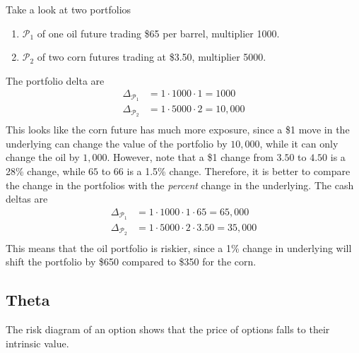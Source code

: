 \documentclass{article}
\begin{document}
    \begin{example}
      Take a look at two portfolios  
      \begin{enumerate}
        \item $\mathcal{P}_1$ of one oil future trading \$65 per barrel, multiplier 1000. 
        \item $\mathcal{P}_2$ of two corn futures trading at \$3.50, multiplier 5000. 
      \end{enumerate}
      The portfolio delta are 
      \begin{align}
        \Delta_{\mathcal{P}_1} & = 1 \cdot 1000 \cdot 1 = 1000 \\ 
        \Delta_{\mathcal{P}_2} & = 1 \cdot 5000 \cdot 2 = 10,000 \\ 
      \end{align}
      This looks like the corn future has much more exposure, since a \$1 move in the underlying can change the value of the portfolio by $10,000$, while it can only change the oil by $1,000$. However, note that a \$1 change from $3.50$ to $4.50$ is a 28\% change, while $65$ to $66$ is a 1.5\% change. Therefore, it is better to compare the change in the portfolios with the \textit{percent} change in the underlying. The cash deltas are 
      \begin{align}
        \Delta_{\mathcal{P}_1} & = 1 \cdot 1000 \cdot 1 \cdot 65 = 65,000 \\ 
        \Delta_{\mathcal{P}_2} & = 1 \cdot 5000 \cdot 2 \cdot 3.50 = 35,000 \\ 
      \end{align}
      This means that the oil portfolio is riskier, since a 1\% change in underlying will shift the portfolio by \$650 compared to \$350 for the corn. 
    \end{example}

  \subsection{Theta}

    The risk diagram of an option shows that the price of options falls to their intrinsic value. 
\end{document}

